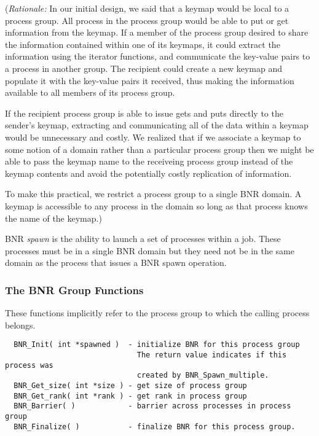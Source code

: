 \documentclass{article}
\begin{document}
({\em Rationale:\/}  In our initial design, we said that a keymap would be
local to a process group.  All process in the process group would be able to
put or get information from the keymap.  If a member of
the process group desired to share the information contained within one of its
keymaps, it could extract the information using the iterator functions, and
communicate the key-value pairs to a process in another group.  The recipient 
could create a new keymap and populate it with the key-value pairs it
received, thus making the information available to all members of its process
group.

If the recipient process group is able to issue gets and puts directly to the sender's
keymap, extracting and communicating all of the data
within a keymap would be unnecessary and costly.  We realized that if we
associate a keymap to some notion of a domain rather than a particular
process group then we might be able to pass the keymap name to the receiveing 
process group instead of the keymap contents and avoid the potentially costly
replication of information.

To make this practical, we restrict a process group to a single BNR domain.  A
keymap is accessible to any process in the domain so long as that process
knows the name of the keymap.)

BNR {\em spawn\/} is the ability to launch a set of processes within a job.  These
processes must be in a single BNR domain but they need not be in the same domain
as the process that issues a BNR spawn operation.

\subsubsection{The BNR Group Functions}
\label{sec:bnr-basic}

These functions implicitly refer to the process group to which the calling
process belongs. 

\begin{verbatim}
  BNR_Init( int *spawned )  - initialize BNR for this process group
                              The return value indicates if this process was
                              created by BNR_Spawn_multiple.
  BNR_Get_size( int *size ) - get size of process group
  BNR_Get_rank( int *rank ) - get rank in process group
  BNR_Barrier( )            - barrier across processes in process group
  BNR_Finalize( )           - finalize BNR for this process group.
\end{verbatim}
\end{document}
